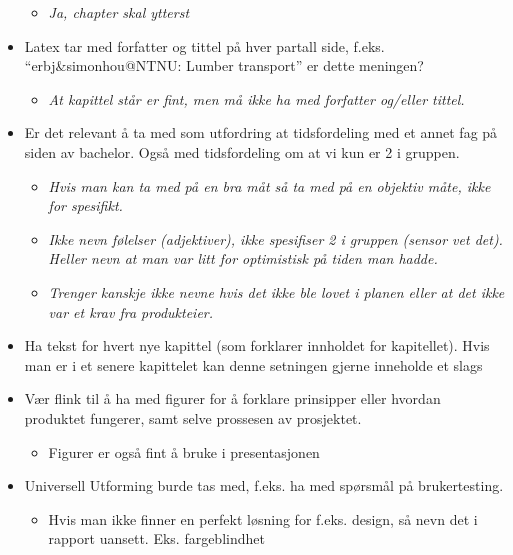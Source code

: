 \begin{itemize}
  \begin{itemize}
  
  \item
    \emph{Ja, chapter skal ytterst}
  \end{itemize}
\item
  Latex tar med forfatter og tittel på hver partall side, f.eks.
  ``erbj\&simonhou@NTNU: Lumber transport'' er dette meningen?

  \begin{itemize}
  
  \item
    \emph{At kapittel står er fint, men må ikke ha med forfatter
    og/eller tittel.}
  \end{itemize}
\item
  Er det relevant å ta med som utfordring at tidsfordeling med et annet
  fag på siden av bachelor. Også med tidsfordeling om at vi kun er 2 i
  gruppen.

  \begin{itemize}
  
  \item
    \emph{Hvis man kan ta med på en bra måt så ta med på en objektiv
    måte, ikke for spesifikt.}
  \item
    \emph{Ikke nevn følelser (adjektiver), ikke spesifiser 2 i gruppen
    (sensor vet det). Heller nevn at man var litt for optimistisk på
    tiden man hadde.}
  \item
    \emph{Trenger kanskje ikke nevne hvis det ikke ble lovet i planen
    eller at det ikke var et krav fra produkteier.}
  \end{itemize}
\item
  Ha tekst for hvert nye kapittel (som forklarer innholdet for
  kapitellet). Hvis man er i et senere kapittelet kan denne setningen
  gjerne inneholde et slags\\
\item
  Vær flink til å ha med figurer for å forklare prinsipper eller hvordan
  produktet fungerer, samt selve prossesen av prosjektet.

  \begin{itemize}
  \item
    Figurer er også fint å bruke i presentasjonen
  \end{itemize}
\item
  Universell Utforming burde tas med, f.eks. ha med spørsmål på
  brukertesting.

  \begin{itemize}
  \item
    Hvis man ikke finner en perfekt løsning for f.eks. design, så nevn
    det i rapport uansett. Eks. fargeblindhet
  \end{itemize}
\end{itemize}
